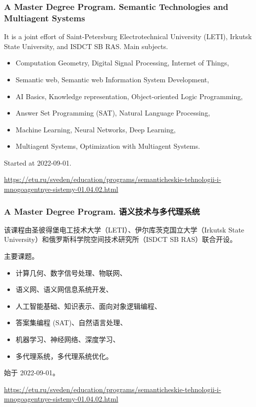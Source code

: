 \documentclass[10pt]{beamer}
\begin{document}
 \begin{frame}
   \frametitle{A Master Degree Program. Semantic Technologies and Multiagent Systems}
   It is a joint effort of Saint-Petersburg Electrotechnical University (LETI), Irkutsk State University, and ISDCT SB RAS.
   Main subjects.

   \begin{itemize}
   \item Computation Geometry, Digital Signal Processing, Internet of Things,
   \item Semantic web, Semantic web Information System Development,
   \item AI Basics, Knowledge representation, Object-oriented Logic Programming,
   \item Answer Set Programming (SAT), Natural Language Processing,
   \item Machine Learning, Neural Networks, Deep Learning,
   \item Multiagent Systems, Optimization with Multiagent Systems.
   \end{itemize}

   Started at 2022-09-01.

   {\footnotesize \url{https://etu.ru/sveden/education/programs/semanticheskie-tehnologii-i-mnogoagentnye-sistemy-01.04.02.html}}
 \end{frame}

 \begin{frame}
   \frametitle{A Master Degree Program.  语义技术与多代理系统}
   该课程由圣彼得堡电工技术大学（LETI）、伊尔库茨克国立大学（Irkutsk State University）和俄罗斯科学院空间技术研究所（ISDCT SB RAS）联合开设。

   主要课题。

   \begin{itemize}
   \item 计算几何、数字信号处理、物联网、
   \item 语义网、语义网信息系统开发、
   \item 人工智能基础、知识表示、面向对象逻辑编程、
   \item 答案集编程 (SAT)、自然语言处理、
   \item 机器学习、神经网络、深度学习、
   \item 多代理系统，多代理系统优化。
   \end{itemize}

   始于 2022-09-01。

   {\footnotesize \url{https://etu.ru/sveden/education/programs/semanticheskie-tehnologii-i-mnogoagentnye-sistemy-01.04.02.html}}
 \end{frame}
\end{document}
